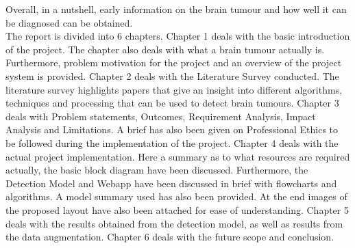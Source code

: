 {Overall, in a nutshell, early information on the brain tumour and how well it can be diagnosed can be obtained.}\\

The report is divided into 6 chapters. Chapter 1 deals with the basic introduction of the project. The chapter also deals with what a brain tumour actually is. Furthermore, problem motivation for the project and an overview of the project system is provided. Chapter 2 deals with the Literature Survey conducted. The literature survey highlights papers that give an insight into different algorithms, techniques and processing that can be used to detect brain tumours. Chapter 3 deals with Problem statements, Outcomes, Requirement Analysis, Impact Analysis and Limitations. A brief has also been given on Professional Ethics to be followed during the implementation of the project. Chapter 4 deals with the actual project implementation. Here a summary as to what resources are required actually, the basic block diagram have been discussed. Furthermore, the Detection Model and Webapp have been discussed in brief with flowcharts and algorithms. A model summary used has also been provided. At the end images of the proposed layout have also been attached for ease of understanding. Chapter 5 deals with the results obtained from the detection model, as well as results from the data augmentation. Chapter 6 deals with the future scope and conclusion.\\
%
